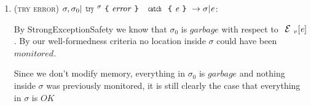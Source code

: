 \begin{enumerate}
\item (\textsc{try error}) $\sigma,\sigma_0|\Kw{try}^\sigma\oC \mathit{error}\cC\ \Kw{catch}\oC\e\cC\rightarrow \sigma|\e$:

By StrongExceptionSafety we know that $\sigma_0$ is $\mathit{garbage}$ with respect to $\ctx_v[\e]$. By our well-formedness criteria no location inside $\sigma$ could have been $monitored$.

Since we don’t modify memory, everything in $\sigma_0$ is $\mathit{garbage}$ and nothing inside $\sigma$ was previously monitored, it is still clearly the case that everything in $\sigma$ is $\mathit{OK}$
\end{enumerate}